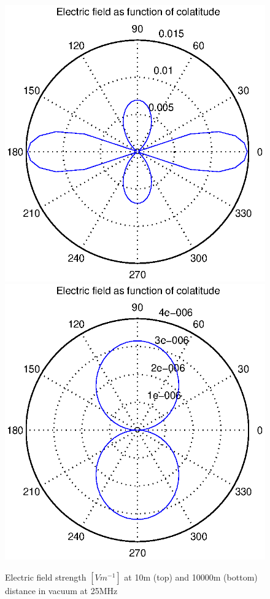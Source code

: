 \documentclass[a4paper,11pt]{thesis}
\begin{document}
\begin{figure}
\begin{center}
  \includegraphics[width=11.5cm]{DissPics/NFvac10m25MHz.eps}
 \includegraphics[width=11.5cm]{DissPics/NFvac10000m25MHz.eps}
  \caption{Electric field strength $[Vm^{-1}]$ at 10m (top) and 10000m (bottom) distance in vacuum at 25MHz}\label{figNFvac10m25MHz}
  \end{center}
\end{figure}
\end{document}

